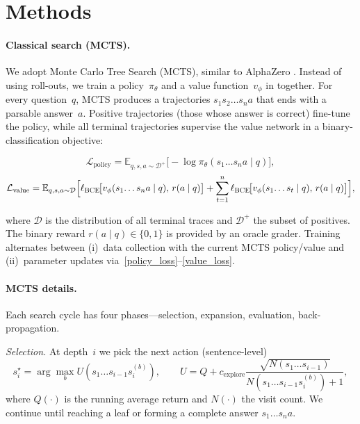 \documentclass{article}
\begin{document}
\section{Methods}

\paragraph{Classical search (MCTS).}
We adopt Monte Carlo Tree Search (MCTS), similar to AlphaZero \cite{feng2023alphazero}.  
Instead of using  roll-outs, we train a policy~$\pi_\theta$ and a value
function~$v_\phi$ in together.
For every question~$q$, MCTS produces a trajectories
$s_1s_2\!\ldots s_n a$ that ends with a parsable answer~$a$.
Positive trajectories (those whose answer is correct) fine-tune the policy, while all terminal
trajectories supervise the value network in a binary-classification objective:

\begin{equation}\label{policy_loss}
  \mathcal{L}_{\text{policy}}
  = \mathbb{E}_{q,s,a\sim\mathcal{D}^+}
    \bigl[-\log \pi_\theta(s_1\!\ldots s_n a \mid q)\bigr],
\end{equation}
\begin{equation}\label{value_loss}
  \mathcal{L}_{\text{value}}
  = \mathbb{E}_{q,s,a\sim\mathcal{D}}
    \Bigl[
      \ell_{\text{BCE}}\!\bigl[v_\phi(s_1\!\ldots s_n a \mid q),\, r(a\mid q)\bigr]
      + \sum_{t=1}^{n}
        \ell_{\text{BCE}}\!\bigl[v_\phi(s_1\!\ldots s_t \mid q),\, r(a\mid q)\bigr]
    \Bigr],
\end{equation}

where $\mathcal{D}$ is the distribution of all terminal traces and
$\mathcal{D}^+$ the subset of positives.
The binary reward $r(a\mid q)\!\in\!\{0,1\}$ is provided by an oracle grader.
Training alternates between
(i)~data collection with the current MCTS policy/value and
(ii)~parameter updates via~\eqref{policy_loss}–\eqref{value_loss}.

\paragraph{MCTS details.}
Each search cycle has four phases—selection, expansion, evaluation, back-propagation.

\textit{Selection.}  
At depth~$i$ we pick the next action (sentence-level)
\[
  s_i^\star
  = \arg\max_b
    U(s_1\!\ldots s_{i-1}s_i^{(b)}),\qquad
  U = Q + c_{\text{explore}}
      \frac{\sqrt{N(s_1\!\ldots s_{i-1})}}
           {N(s_1\!\ldots s_{i-1}s_i^{(b)})+1},
\]
where $Q(\cdot)$ is the running average return and
$N(\cdot)$ the visit count.
We continue until reaching a leaf or forming a complete answer
$s_1\!\ldots s_n a$.
\end{document}
